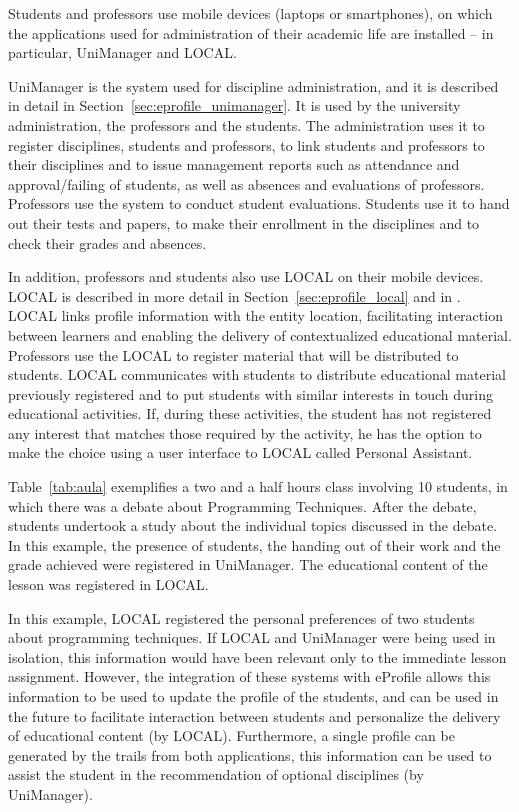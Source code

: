 \documentclass{svjour3}                     %
\begin{document}

Students and professors use mobile devices (laptops or smartphones), on which the applications used for administration of their academic life are installed -- in particular, UniManager and LOCAL.

UniManager is the system used for discipline administration, and it is described in detail in Section~\ref{sec:eprofile_unimanager}. It is used by the university administration, the professors and the students. The administration uses it to register disciplines, students and professors, to link students and professors to their disciplines and to issue management reports such as attendance and approval/failing of students, as well as absences and evaluations of professors. Professors use the system to conduct student evaluations. Students use it to hand out their tests and papers, to make their enrollment in the disciplines and to check their grades and absences.

In addition, professors and students also use LOCAL on their mobile devices. LOCAL is described in more detail in Section~\ref{sec:eprofile_local} and in \citep{barbosa11}. LOCAL links profile information with the entity location, facilitating interaction between learners and enabling the delivery of contextualized educational material. Professors use the LOCAL to register material that will be distributed to students. LOCAL communicates with students to distribute educational material previously registered and to put students with similar interests in touch during educational activities. If, during these activities, the student has not registered any interest that matches those required by the activity, he has the option to make the choice using a user interface to LOCAL called Personal Assistant.

Table~\ref{tab:aula} exemplifies a two and a half hours class involving 10 students, in which there was a debate about Programming Techniques. After the debate, students undertook a study about the individual topics discussed in the debate. In this example, the presence of students, the handing out of their work and the grade achieved were registered in UniManager. The educational content of the lesson was registered in LOCAL.

In this example, LOCAL registered the personal preferences of two students about programming techniques. If LOCAL and UniManager were being used in isolation, this information would have been relevant only to the immediate lesson assignment. However, the integration of these systems with eProfile allows this information to be used to update the profile of the students, and can be used in the future to facilitate interaction between students and personalize the delivery of educational content (by LOCAL). Furthermore, a single profile can be generated by the trails from both applications, this information can be used to assist the student in the recommendation of optional disciplines (by UniManager).
\end{document}
